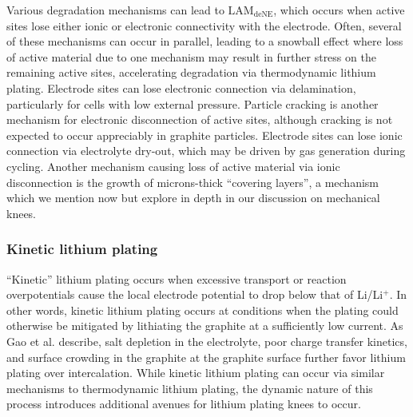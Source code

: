 \documentclass[journal=jpclcd,manuscript=article]{achemso}
\begin{document}
Various degradation mechanisms can lead to $\mathrm{LAM_{deNE}}$, which occurs when active sites lose either ionic or electronic connectivity with the electrode.
Often, several of these mechanisms can occur in parallel, leading to a snowball effect where loss of active material due to one mechanism may result in further stress on the remaining active sites, accelerating degradation via thermodynamic lithium plating.
Electrode sites can lose electronic connection via delamination\cite{liu_aging_2010, cannarella_stress_2014, somerville_effect_2016, willenberg_high-precision_2020}, particularly for cells with low external pressure\cite{cannarella_stress_2014}. Particle cracking is another mechanism for electronic disconnection of active sites, although cracking is not expected to occur appreciably in graphite particles.\cite{takahashi_examination_2015}
Electrode sites can lose ionic connection via electrolyte dry-out, which may be driven by gas generation during cycling.\cite{mao_calendar_2017, kupper_end--life_2018}
Another mechanism causing loss of active material via ionic disconnection is the growth of microns-thick ``covering layers'', a mechanism which we mention now but explore in depth in our discussion on mechanical knees.

\subsubsection{Kinetic lithium plating}

``Kinetic'' lithium plating occurs when excessive transport or reaction overpotentials cause the local electrode potential to drop below that of Li/Li$\mathrm{^+}$.
In other words, kinetic lithium plating occurs at conditions when the plating could otherwise be mitigated by lithiating the graphite at a sufficiently low current. As Gao et al.\cite{gao_interplay_2021} describe, salt depletion in the electrolyte, poor charge transfer kinetics, and surface crowding in the graphite at the graphite surface further favor lithium plating over intercalation. While kinetic lithium plating can occur via similar mechanisms to thermodynamic lithium plating, the dynamic nature of this process introduces additional avenues for lithium plating knees to occur.
\end{document}
